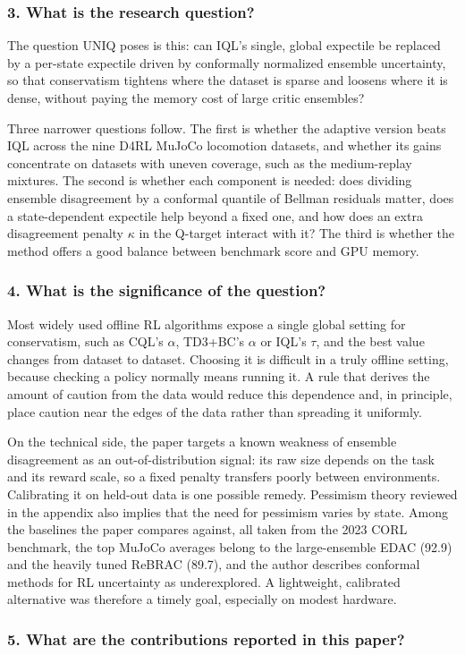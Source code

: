 \documentclass[11pt]{article}
\newcommand{\question}[1]{\subsubsection*{#1}}
\begin{document}
\question{3. What is the research question?}

The question UNIQ poses is this: can IQL's single, global expectile be replaced by a per-state expectile driven by conformally normalized ensemble uncertainty, so that conservatism tightens where the dataset is sparse and loosens where it is dense, without paying the memory cost of large critic ensembles?

Three narrower questions follow. The first is whether the adaptive version beats IQL across the nine D4RL MuJoCo locomotion datasets, and whether its gains concentrate on datasets with uneven coverage, such as the medium-replay mixtures. The second is whether each component is needed: does dividing ensemble disagreement by a conformal quantile of Bellman residuals matter, does a state-dependent expectile help beyond a fixed one, and how does an extra disagreement penalty \ensuremath{\kappa} in the Q-target interact with it? The third is whether the method offers a good balance between benchmark score and GPU memory.

\question{4. What is the significance of the question?}

Most widely used offline RL algorithms expose a single global setting for conservatism, such as CQL's \ensuremath{\alpha}, TD3+BC's \ensuremath{\alpha} or IQL's \ensuremath{\tau}, and the best value changes from dataset to dataset. Choosing it is difficult in a truly offline setting, because checking a policy normally means running it. A rule that derives the amount of caution from the data would reduce this dependence and, in principle, place caution near the edges of the data rather than spreading it uniformly.

On the technical side, the paper targets a known weakness of ensemble disagreement as an out-of-distribution signal: its raw size depends on the task and its reward scale, so a fixed penalty transfers poorly between environments. Calibrating it on held-out data is one possible remedy. Pessimism theory reviewed in the appendix also implies that the need for pessimism varies by state. Among the baselines the paper compares against, all taken from the 2023 CORL benchmark, the top MuJoCo averages belong to the large-ensemble EDAC (92.9) and the heavily tuned ReBRAC (89.7), and the author describes conformal methods for RL uncertainty as underexplored. A lightweight, calibrated alternative was therefore a timely goal, especially on modest hardware.

\question{5. What are the contributions reported in this paper?}
\end{document}
